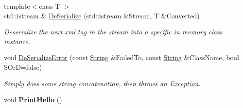 \begin{DoxyCompactItemize}
{\footnotesize template$<$class T $>$ }\\std\-::istream \& \hyperlink{namespaceMezzanine_ad8989ea81ccd1ad6d59a11921f0239a4}{De\-Serialize} (std\-::istream \&Stream, T \&Converted)
\begin{DoxyCompactList}\small\item\em Deserialize the next xml tag in the stream into a specific in memory class instance. \end{DoxyCompactList}\item 
void \hyperlink{namespaceMezzanine_aec75a8a3369287cb02f331c62b32df73}{De\-Serialize\-Error} (const \hyperlink{namespaceMezzanine_acf9fcc130e6ebf08e3d8491aebcf1c86}{String} \&Failed\-To, const \hyperlink{namespaceMezzanine_acf9fcc130e6ebf08e3d8491aebcf1c86}{String} \&Class\-Name, bool S\-Or\-D=false)
\begin{DoxyCompactList}\small\item\em Simply does some string concatenation, then throws an \hyperlink{classMezzanine_1_1Exception}{Exception}. \end{DoxyCompactList}\item 
\hypertarget{namespaceMezzanine_a2f11f2ef7129480d902dc4995c3c8633}{void {\bfseries Print\-Hello} ()}\label{namespaceMezzanine_a2f11f2ef7129480d902dc4995c3c8633}


\end{DoxyCompactItemize}
